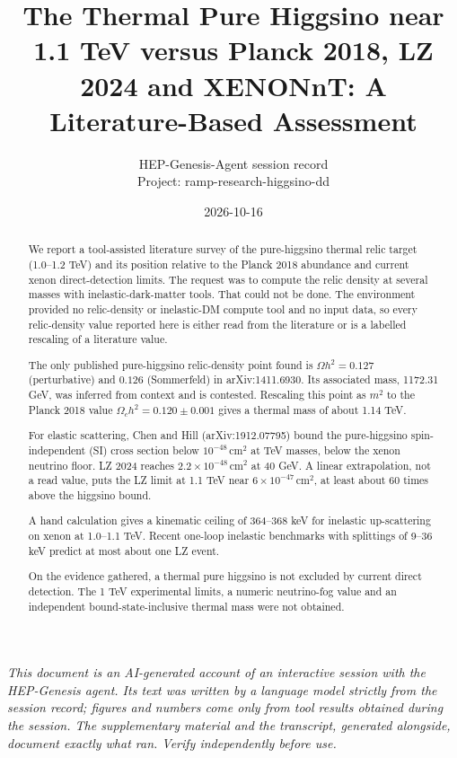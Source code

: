 \documentclass[11pt,a4paper]{article}
\title{The Thermal Pure Higgsino near 1.1 TeV versus Planck 2018, LZ 2024 and XENONnT: A Literature-Based Assessment}
\author{HEP-Genesis-Agent session record \\ \small Project: ramp-research-higgsino-dd}
\date{2026-10-16}
\begin{document}
\maketitle
\noindent\textit{\small This document is an AI-generated account of an interactive session with the HEP-Genesis agent. Its text was written by a language model strictly from the session record; figures and numbers come only from tool results obtained during the session. The supplementary material and the transcript, generated alongside, document exactly what ran. Verify independently before use.}
\vspace{1em}

\begin{abstract}
We report a tool-assisted literature survey of the pure-higgsino thermal relic target (1.0--1.2 TeV) and its position relative to the Planck 2018 abundance and current xenon direct-detection limits. The request was to compute the relic density at several masses with inelastic-dark-matter tools. That could not be done. The environment provided no relic-density or inelastic-DM compute tool and no input data, so every relic-density value reported here is either read from the literature or is a labelled rescaling of a literature value.

The only published pure-higgsino relic-density point found is $\Omega h^2 = 0.127$ (perturbative) and $0.126$ (Sommerfeld) in arXiv:1411.6930. Its associated mass, 1172.31 GeV, was inferred from context and is contested. Rescaling this point as $m^2$ to the Planck 2018 value $\Omega_c h^2 = 0.120 \pm 0.001$ gives a thermal mass of about 1.14 TeV.

For elastic scattering, Chen and Hill (arXiv:1912.07795) bound the pure-higgsino spin-independent (SI) cross section below $10^{-48}\,\mathrm{cm^2}$ at TeV masses, below the xenon neutrino floor. LZ 2024 reaches $2.2\times10^{-48}\,\mathrm{cm^2}$ at 40 GeV. A linear extrapolation, not a read value, puts the LZ limit at 1.1 TeV near $6\times10^{-47}\,\mathrm{cm^2}$, at least about 60 times above the higgsino bound.

A hand calculation gives a kinematic ceiling of 364--368 keV for inelastic up-scattering on xenon at 1.0--1.1 TeV. Recent one-loop inelastic benchmarks with splittings of 9--36 keV predict at most about one LZ event.

On the evidence gathered, a thermal pure higgsino is not excluded by current direct detection. The 1 TeV experimental limits, a numeric neutrino-fog value and an independent bound-state-inclusive thermal mass were not obtained.
\end{abstract}
\end{document}
